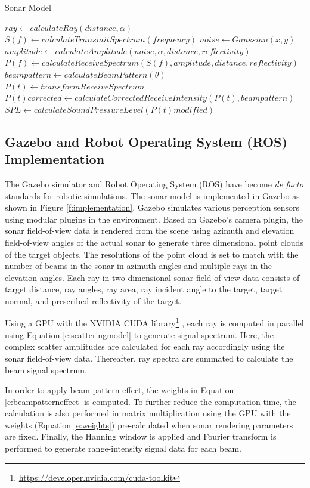 \documentclass[utf8]{frontiersSCNS} %
\begin{document}
\begin{algorithm*}
\caption{Sonar Model}
\begin{algorithmic}
\STATE $ray \leftarrow calculateRay(distance, \alpha)$
\STATE $S(f) \leftarrow calculateTransmitSpectrum(frequency)$
        \STATE $noise \leftarrow Gaussian(x,y)$
        \STATE $amplitude \leftarrow calculateAmplitude(noise, \alpha, distance, reflectivity)$
        \STATE $P(f) \leftarrow calculateReceiveSpectrum(S(f), amplitude, distance, reflectivity)$
    \ENDFOR
    \STATE $beampattern \leftarrow calculateBeamPattern(\theta)$
    \STATE $P(t) \leftarrow transformReceiveSpectrum$
\ENDFOR
\STATE $P(t)corrected \leftarrow calculateCorrectedReceiveIntensity(P(t), beampattern)$
\STATE $SPL \leftarrow calculateSoundPressureLevel(P(t)modified)$
  \label{alg}
\end{algorithmic}
\end{algorithm*}


\subsection{Gazebo and Robot Operating System (ROS) Implementation}
The Gazebo simulator and Robot Operating System (ROS) have become \emph{de facto} standards for robotic simulations. The sonar model is implemented in Gazebo as shown in Figure \ref{f:implementation}. Gazebo simulates various perception sensors using modular plugins in the environment. Based on Gazebo's camera plugin, the sonar field-of-view data is rendered from the scene using azimuth and elevation field-of-view angles of the actual sonar to generate three dimensional point clouds of the target objects. The resolutions of the point cloud is set to match with the number of beams in the sonar in azimuth angles and multiple rays in the elevation angles. Each ray in two dimensional sonar field-of-view data consists of target distance, ray angles, ray area, ray incident angle to the target, target normal, and prescribed reflectivity of the target.

Using a GPU with the NVIDIA CUDA library\footnote{\url{https://developer.nvidia.com/cuda-toolkit}} \citep{cuda}, each ray is computed in parallel using Equation \ref{e:scatteringmodel} to generate signal spectrum. Here, the complex scatter amplitudes are calculated for each ray accordingly using the sonar field-of-view data. Thereafter, ray spectra are summated to calculate the beam signal spectrum.

In order to apply beam pattern effect, the weights in Equation \ref{e:beampatterneffect} is computed. To further reduce the computation time, the calculation is also performed in matrix multiplication using the GPU with the weights (Equation \ref{e:weights}) pre-calculated when sonar rendering parameters are fixed. Finally, the Hanning window is applied and Fourier transform is performed to generate range-intensity signal data for each beam. 
\end{document}
